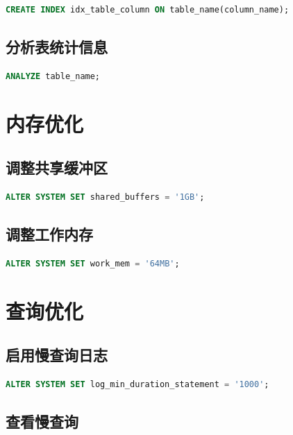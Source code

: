 \documentclass[12pt,UTF8]{ctexbook}
\begin{document}
\begin{lstlisting}[language=sql, caption=创建索引]
CREATE INDEX idx_table_column ON table_name(column_name);
\end{lstlisting}

\subsection{分析表统计信息}

\begin{lstlisting}[language=sql, caption=更新表统计信息]
ANALYZE table_name;
\end{lstlisting}

\section{内存优化}

\subsection{调整共享缓冲区}

\begin{lstlisting}[language=sql, caption=调整共享缓冲区大小]
ALTER SYSTEM SET shared_buffers = '1GB';
\end{lstlisting}

\subsection{调整工作内存}

\begin{lstlisting}[language=sql, caption=调整工作内存]
ALTER SYSTEM SET work_mem = '64MB';
\end{lstlisting}

\section{查询优化}

\subsection{启用慢查询日志}

\begin{lstlisting}[language=sql, caption=启用慢查询日志]
ALTER SYSTEM SET log_min_duration_statement = '1000';
\end{lstlisting}

\subsection{查看慢查询}
\end{document}
